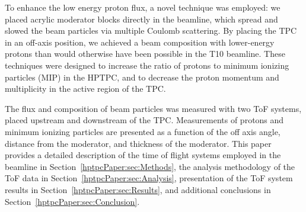 To enhance the low energy proton flux, a novel technique was employed:
we placed acrylic moderator blocks directly in the beamline, which spread and slowed the beam particles via multiple Coulomb scattering.
By placing the TPC in an off-axis position, we achieved a beam composition with lower-energy protons than would otherwise have been possible in the T10 beamline.
These techniques were designed to increase the ratio of protons to minimum ionizing particles (MIP) in the HPTPC, and to decrease the proton momentum and multiplicity in the active region of the TPC.

The flux and composition of beam particles was measured with two ToF systems, placed upstream and downstream of the TPC.
Measurements of protons and minimum ionizing particles are presented as a function of the off axis angle, distance from the moderator, and thickness of the moderator.
This paper provides a detailed description of the time of flight systems employed in the beamline in Section~\ref{hptpcPaper:sec:Methods}, the analysis methodology of the ToF data in Section~\ref{hptpcPaper:sec:Analysis}, presentation of the ToF system results in Section~\ref{hptpcPaper:sec:Results}, and additional conclusions in Section~\ref{hptpcPaper:sec:Conclusion}.
